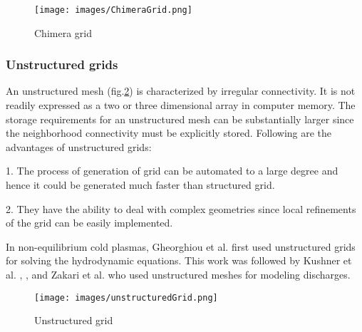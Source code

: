 \documentclass[paper=a4, fontsize=13pt]{scrartcl}
\begin{document}


\begin{figure}[t!]
\centering
\texttt{[image: images/ChimeraGrid.png]}
 \caption{Chimera grid \cite{Petersson1999Hole-CuttingGrids}}
  \label{fig:chimera}
\end{figure}

\subsubsection{Unstructured grids}

An unstructured mesh (fig.\ref{fig:unstructured grid}) is characterized by irregular connectivity. It is not readily expressed as a two or three dimensional array in computer memory. The storage requirements for an unstructured mesh can be substantially larger since the neighborhood connectivity must be explicitly stored. Following are the advantages of unstructured grids:

1. The process of generation of grid can be automated to a large degree and hence it could be generated much faster than structured grid.

2. They have the ability to deal with complex geometries since local refinements of the grid can be easily implemented.

In non-equilibrium cold plasmas, Gheorghiou et al. \cite{Georghiou1999AnAlgorithm} first used unstructured grids for solving the hydrodynamic equations. This work was followed by Kushner et al. \cite{Lay2003BreakdownLamps}, \cite{Ducasse2007CriticalMethods}, \cite{Papageorgiou2011Three-dimensionalPhenomena} and Zakari et al. \cite{Zakari2015AnDischarge} who used unstructured meshes for modeling discharges.

\begin{figure}
\centering
\texttt{[image: images/unstructuredGrid.png]}
 \caption{Unstructured grid \cite{Morgan1998UnstructuredMechanics}}
  \label{fig:unstructured grid}
\end{figure}
\end{document}

